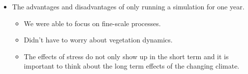 \begin{itemize}
    \item The advantages and disadvantages of only running a simulation for one year.
        \begin{itemize}
            \item We were able to focus on fine-scale processes.
            \item Didn't have to worry about vegetation dynamics.
            \item The effects of stress do not only show up in the short term and it is important to think about the long term effects of the changing climate.
        \end{itemize}
\end{itemize}